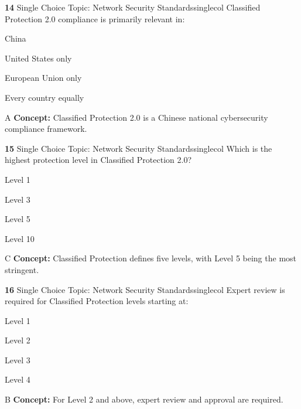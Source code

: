 \documentclass[10pt,a4paper]{article}
\begin{document}
\begin{qcard}{\color{white}\textbf{14} \hfill \small Single Choice \textbar{} Topic: Network Security Standards}{singlecol}
Classified Protection 2.0 compliance is primarily relevant in:

\begin{qoptions}
\item China
\item United States only
\item European Union only
\item Every country equally
\end{qoptions}
\begin{explainbox}{A}
\textbf{Concept:} Classified Protection 2.0 is a Chinese national cybersecurity compliance framework.
\end{explainbox}
\end{qcard}

\begin{qcard}{\color{white}\textbf{15} \hfill \small Single Choice \textbar{} Topic: Network Security Standards}{singlecol}
Which is the highest protection level in Classified Protection 2.0?

\begin{qoptions}
\item Level 1
\item Level 3
\item Level 5
\item Level 10
\end{qoptions}
\begin{explainbox}{C}
\textbf{Concept:} Classified Protection defines five levels, with Level 5 being the most stringent.
\end{explainbox}
\end{qcard}

\begin{qcard}{\color{white}\textbf{16} \hfill \small Single Choice \textbar{} Topic: Network Security Standards}{singlecol}
Expert review is required for Classified Protection levels starting at:

\begin{qoptions}
\item Level 1
\item Level 2
\item Level 3
\item Level 4
\end{qoptions}
\begin{explainbox}{B}
\textbf{Concept:} For Level 2 and above, expert review and approval are required.
\end{explainbox}
\end{qcard}
\end{document}
